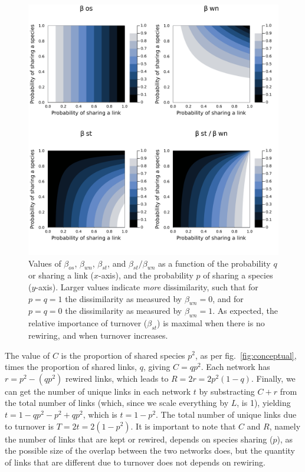 \documentclass[11pt]{article}
\makeatletter
\def\maxwidth{\ifdim\Gin@nat@width>\linewidth\linewidth
\else\Gin@nat@width\fi}
\let\Oldincludegraphics\includegraphics
\renewcommand{\includegraphics}[1]{\Oldincludegraphics[width=\maxwidth]{#1}}
\makeatother
\begin{document}
\begin{figure}
\hypertarget{fig:turnrew}{%
\centering
\includegraphics{figures/sharing_v_rewiring/components.png}
\caption{Values of \(\beta_{os}\), \(\beta_{wn}\), \(\beta_{st}\), and
\(\beta_{st}/\beta_{wn}\) as a function of the probability \(q\) or
sharing a link (\(x\)-axis), and the probability \(p\) of sharing a
species (\(y\)-axis). Larger values indicate \emph{more} dissimilarity,
such that for \(p=q=1\) the dissimilarity as measured by
\(\beta_{wn}=0\), and for \(p=q=0\) the dissimilarity as measured by
\(\beta_{wn}=1\). As expected, the relative importance of turnover
(\(\beta_{st}\)) is maximal when there is no rewiring, and when turnover
increases.}\label{fig:turnrew}
}
\end{figure}

The value of \(C\) is the proportion of shared species \(p^2\), as per
fig.~\ref{fig:conceptual}, times the proportion of shared links, \(q\),
giving \(C = qp^2\). Each network has \(r = p^2-(qp^2)\) rewired links,
which leads to \(R = 2r = 2p^2(1-q)\). Finally, we can get the number of
unique links in each network \(t\) by substracting \(C+r\) from the
total number of links (which, since we scale everything by \(L\), is 1),
yielding \(t = 1 - qp^2 - p^2 + qp^2\), which is \(t = 1-p^2\). The
total number of unique links due to turnover is \(T = 2t = 2(1-p^2)\).
It is important to note that \(C\) and \(R\), namely the number of links
that are kept or rewired, depends on species sharing (\(p\)), as the
possible size of the overlap between the two networks does, but the
quantity of links that are different due to turnover does not depends on
rewiring.
\end{document}

